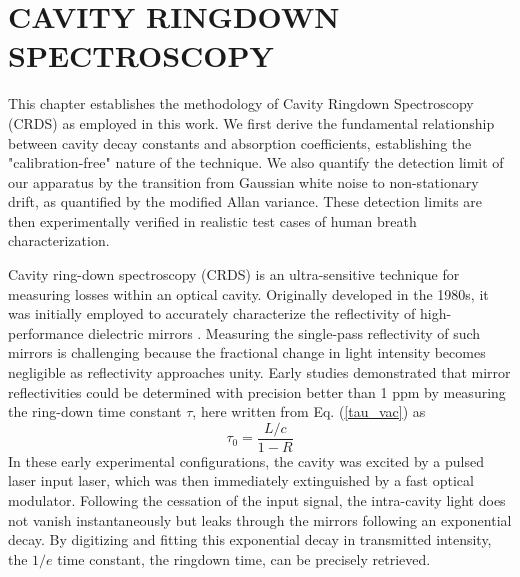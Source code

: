 \documentclass[12pt]{report}
\begin{document}
	\chapter{CAVITY RINGDOWN SPECTROSCOPY} \label{chap:CRDS}
	
	This chapter establishes the methodology of Cavity Ringdown Spectroscopy (CRDS) as employed in this work. We first derive the fundamental relationship between cavity decay constants and absorption coefficients, establishing the "calibration-free" nature of the technique. We also quantify the detection limit of our apparatus by the transition from Gaussian white noise to non-stationary drift, as quantified by the modified Allan variance. These detection limits are then experimentally verified in realistic test cases of human breath characterization.
		
	Cavity ring-down spectroscopy (CRDS) is an ultra-sensitive technique for measuring losses within an optical cavity. Originally developed in the 1980s, it was initially employed to accurately characterize the reflectivity of high-performance dielectric mirrors \cite{book_crds}. Measuring the single-pass reflectivity of such mirrors is challenging because the fractional change in light intensity becomes negligible as reflectivity approaches unity. Early studies \cite{crds_mirror_R_Herbelin, crds_mirror_R_Anderson} demonstrated that mirror reflectivities could be determined with precision better than 1 ppm by measuring the ring-down time constant $\tau$, here written from Eq. (\ref{tau_vac}) as
	\begin{equation} \label{crds_tau_vac}
		\tau_0 = \frac{L/c}{1-R}
	\end{equation}
	In these early experimental configurations, the cavity was excited by a pulsed laser input laser, which was then immediately extinguished by a fast optical modulator. Following the cessation of the input signal, the intra-cavity light does not vanish instantaneously but leaks through the mirrors following an exponential decay. By digitizing and fitting this exponential decay in transmitted intensity, the $1/e$ time constant, the ringdown time, can be precisely retrieved.
	
\end{document}

